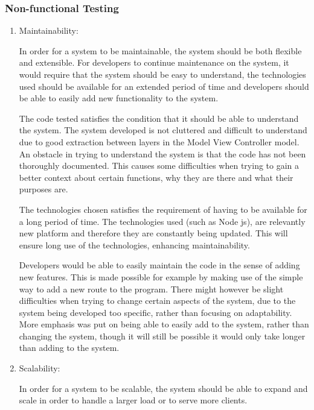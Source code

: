 \documentclass[hidelinks, 12pt, oneside]{article}
\begin{document}
 

\subsubsection{Non-functional Testing} 

\begin{enumerate}
\item Maintainability: 

In order for a system to be maintainable, the system should be both flexible and extensible.  For developers to continue maintenance on the system, it would require that the system should be easy to understand, the technologies used should be available for an extended period of time and developers should be able to easily add new functionality to the system. 

The code tested satisfies the condition that it should be able to understand the system. The system developed is not cluttered and difficult to understand due to good extraction between layers in the Model View Controller model. An obstacle in trying to understand the system is that the code has not been thoroughly documented. This causes some difficulties when trying to gain a better context about certain functions, why they are there and what their purposes are.

The technologies chosen satisfies the requirement of having to be available for a long period of time. The technologies used (such as Node js), are relevantly new platform and therefore they are constantly being updated. This will ensure long use of the technologies, enhancing maintainability.

Developers would be able to easily maintain the code in the sense of adding new features. This is made possible for example by making use of the simple way to add a new route to the program. There might however be slight difficulties when trying to change certain aspects of the system, due to the system being developed too specific, rather than focusing on adaptability. More emphasis was put on being able to easily add to the system, rather than changing the system, though it will still be possible it would only take longer than adding to the system.

\item Scalability:

In order for a system to be scalable, the system should be able to expand and scale in order to handle a larger load or to serve more clients. 


\end{enumerate}
\end{document}
